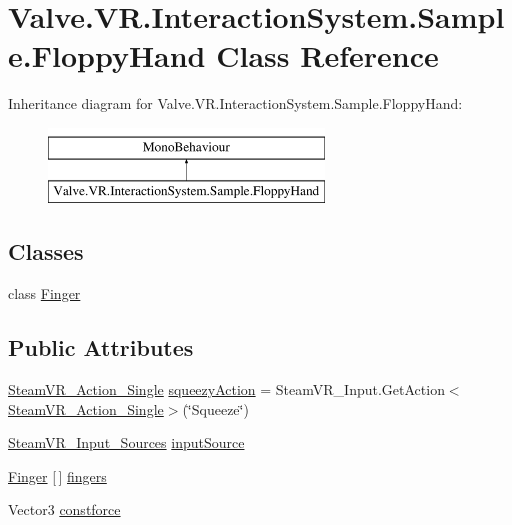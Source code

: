 \hypertarget{class_valve_1_1_v_r_1_1_interaction_system_1_1_sample_1_1_floppy_hand}{}\section{Valve.\+V\+R.\+Interaction\+System.\+Sample.\+Floppy\+Hand Class Reference}
\label{class_valve_1_1_v_r_1_1_interaction_system_1_1_sample_1_1_floppy_hand}
Inheritance diagram for Valve.\+V\+R.\+Interaction\+System.\+Sample.\+Floppy\+Hand\+:\begin{figure}[H]
\begin{center}
\leavevmode
\includegraphics[height=2.000000cm]{class_valve_1_1_v_r_1_1_interaction_system_1_1_sample_1_1_floppy_hand}
\end{center}
\end{figure}
\subsection*{Classes}
\begin{DoxyCompactItemize}
\item 
class \mbox{\hyperlink{class_valve_1_1_v_r_1_1_interaction_system_1_1_sample_1_1_floppy_hand_1_1_finger}{Finger}}
\end{DoxyCompactItemize}
\subsection*{Public Attributes}
\begin{DoxyCompactItemize}
\item 
\mbox{\hyperlink{class_valve_1_1_v_r_1_1_steam_v_r___action___single}{Steam\+V\+R\+\_\+\+Action\+\_\+\+Single}} \mbox{\hyperlink{class_valve_1_1_v_r_1_1_interaction_system_1_1_sample_1_1_floppy_hand_ab523fc013ed2eeaa22a1f8d4aa6882b0}{squeezy\+Action}} = Steam\+V\+R\+\_\+\+Input.\+Get\+Action$<$\mbox{\hyperlink{class_valve_1_1_v_r_1_1_steam_v_r___action___single}{Steam\+V\+R\+\_\+\+Action\+\_\+\+Single}}$>$(\char`\"{}Squeeze\char`\"{})
\item 
\mbox{\hyperlink{namespace_valve_1_1_v_r_a82e5bf501cc3aa155444ee3f0662853f}{Steam\+V\+R\+\_\+\+Input\+\_\+\+Sources}} \mbox{\hyperlink{class_valve_1_1_v_r_1_1_interaction_system_1_1_sample_1_1_floppy_hand_a72b3bab5c350ea43098ffb65d9b6db19}{input\+Source}}
\item 
\mbox{\hyperlink{class_valve_1_1_v_r_1_1_interaction_system_1_1_sample_1_1_floppy_hand_1_1_finger}{Finger}} \mbox{[}$\,$\mbox{]} \mbox{\hyperlink{class_valve_1_1_v_r_1_1_interaction_system_1_1_sample_1_1_floppy_hand_a3e38eee6e202a4553aa52e660ed43dc5}{fingers}}
\item 
Vector3 \mbox{\hyperlink{class_valve_1_1_v_r_1_1_interaction_system_1_1_sample_1_1_floppy_hand_a61bd769a974ee3eeaea5d2c6c179328c}{constforce}}
\end{DoxyCompactItemize}
